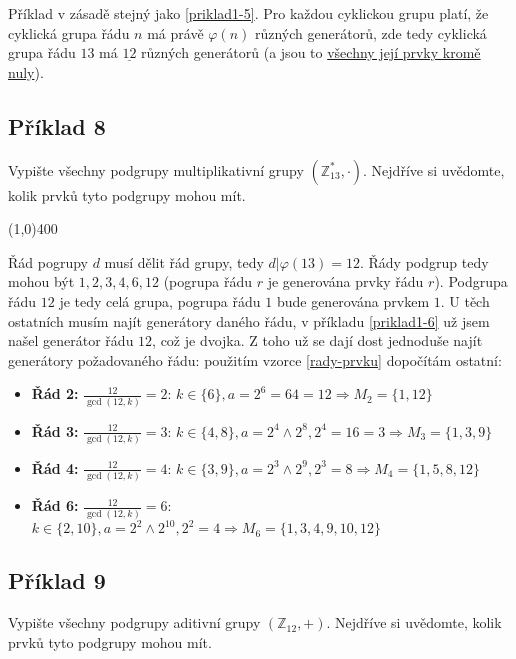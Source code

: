 \documentclass{article}
\begin{document}
Příklad v zásadě stejný jako \ref{priklad1-5}. Pro každou cyklickou grupu platí, že cyklická grupa řádu $n$ má právě $\varphi(n)$ různých generátorů, zde tedy cyklická grupa řádu $13$ má $\underline{12}$ různých generátorů (a jsou to \underline{všechny její prvky kromě nuly}).

\subsection{\label{priklad1-8}Příklad 8}
Vypište všechny podgrupy multiplikativní grupy $(\mathbb{Z}_{13}^{*},\cdot)$. Nejdříve si uvědomte, kolik prvků tyto podgrupy mohou mít.

\line(1,0){400}

Řád pogrupy $d$ musí dělit řád grupy, tedy $d | \varphi(13) = 12$. Řády podgrup tedy mohou být ${1,2,3,4,6,12}$ (pogrupa řádu $r$ je generována prvky řádu $r$). Podgrupa řádu $12$ je tedy celá grupa, pogrupa řádu $1$ bude generována prvkem $1$. U těch ostatních musím najít generátory daného řádu, v příkladu \ref{priklad1-6} už jsem našel generátor řádu $12$, což je dvojka. Z toho už se dají dost jednoduše najít generátory požadovaného řádu: použitím vzorce \ref{rady-prvku} dopočítám ostatní:

\begin{itemize}
	\item \textbf{Řád 2:} $\frac{12}{\gcd(12, k)} = 2$: $k \in \{6\}, a = 2^6 = 64 = 12 \Rightarrow M_2 = \{1,12\}$
	\item \textbf{Řád 3:} $\frac{12}{\gcd(12, k)} = 3$: $k \in \{4,8\}, a = 2^4 \wedge 2^8, 2^4 = 16 = 3 \Rightarrow M_3 = \{1, 3, 9\}$
	\item \textbf{Řád 4:} $\frac{12}{\gcd(12, k)} = 4$: $k \in \{3,9\}, a = 2^3 \wedge 2^9, 2^3 = 8 \Rightarrow M_4 = \{1, 5, 8, 12\}$
	\item \textbf{Řád 6:} $\frac{12}{\gcd(12, k)} = 6$: $k \in \{2,10\}, a = 2^2 \wedge 2^{10}, 2^2 = 4 \Rightarrow M_6 = \{1, 3, 4, 9, 10, 12\}$
\end{itemize}  


\subsection{\label{priklad1-9}Příklad 9}
Vypište všechny podgrupy aditivní grupy $(\mathbb{Z}_{12},+)$. Nejdříve si uvědomte, kolik prvků tyto podgrupy mohou mít.
\end{document}
